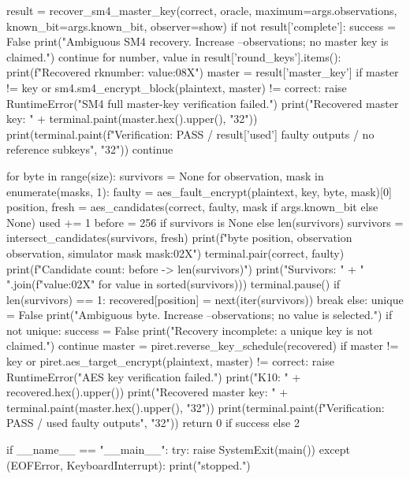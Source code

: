 \begin{lightcode}[numbers=left,firstnumber=1]
            result = recover_sm4_master_key(correct, oracle, maximum=args.observations, known_bit=args.known_bit, observer=show)
            if not result['complete']:
                success = False
                print("Ambiguous SM4 recovery. Increase --observations; no master key is claimed.")
                continue
            for number, value in result['round_keys'].items():
                print(f"Recovered rk{number}: {value:08X}")
            master = result['master_key']
            if master != key or sm4.sm4_encrypt_block(plaintext, master) != correct:
                raise RuntimeError("SM4 full master-key verification failed.")
            print("Recovered master key: " + terminal.paint(master.hex().upper(), "32"))
            print(terminal.paint(f"Verification: PASS / {result['used']} faulty outputs / no reference subkeys", "32"))
            continue

        for byte in range(size):
            survivors = None
            for observation, mask in enumerate(masks, 1):
                faulty = aes_fault_encrypt(plaintext, key, byte, mask)[0]
                position, fresh = aes_candidates(correct, faulty, mask if args.known_bit else None)
                used += 1
                before = 256 if survivors is None else len(survivors)
                survivors = intersect_candidates(survivors, fresh)
                print(f"\nKey byte {position}, observation {observation}, simulator mask {mask:02X}")
                terminal.pair(correct, faulty)
                print(f"Candidate count: {before} -> {len(survivors)}")
                print("Survivors: " + " ".join(f"{value:02X}" for value in sorted(survivors)))
                terminal.pause()
                if len(survivors) == 1:
                    recovered[position] = next(iter(survivors))
                    break
            else:
                unique = False
                print("Ambiguous byte. Increase --observations; no value is selected.")
        if not unique:
            success = False
            print("Recovery incomplete: a unique key is not claimed.")
            continue
        master = piret.reverse_key_schedule(recovered)
        if master != key or piret.aes_target_encrypt(plaintext, master) != correct:
            raise RuntimeError("AES key verification failed.")
        print("\nRecovered K10: " + recovered.hex().upper())
        print("Recovered master key: " + terminal.paint(master.hex().upper(), "32"))
        print(terminal.paint(f"Verification: PASS / {used} faulty outputs", "32"))
    return 0 if success else 2


if __name__ == "__main__":
    try:
        raise SystemExit(main())
    except (EOFError, KeyboardInterrupt):
        print("\nLesson stopped.")
\end{lightcode}

